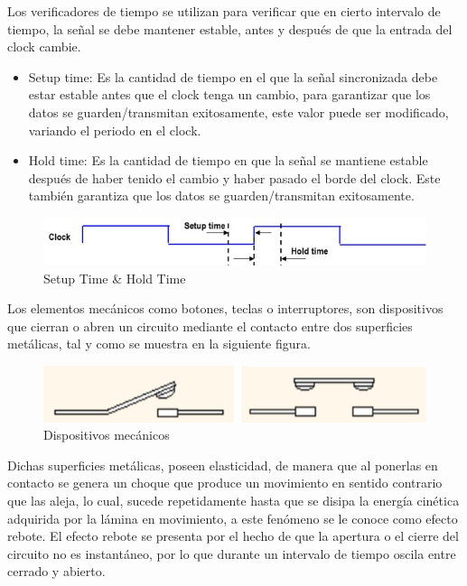 \documentclass[journal,trans]{IEEEtran}
\begin{document}
	Los verificadores de tiempo se utilizan para verificar que en cierto intervalo de tiempo, la señal se debe mantener estable, antes y después de que la entrada del clock cambie.
	
	\vspace{10mm}
	
	\begin{itemize}
		\item Setup time: Es la cantidad de tiempo en el que la señal sincronizada debe estar estable antes que el clock tenga un cambio, para garantizar que los datos se guarden/transmitan exitosamente, este valor puede ser modificado, variando el periodo en el clock.
		\item Hold time: Es la cantidad de tiempo en que la señal se mantiene estable después de haber tenido el cambio y haber pasado el borde del clock. Este también garantiza que los datos se guarden/transmitan exitosamente. 
	\end{itemize}
	
	\begin{figure}[h]
		\centering
		\includegraphics[width=\linewidth]{./imagenes/setup_hold.jpg}
		\caption{Setup Time \& Hold Time \cite{rebote}}
		\label{fig:setup-time}
	\end{figure}
	
	
	Los elementos mecánicos como botones, teclas o interruptores, son dispositivos que cierran o abren un circuito mediante el contacto entre dos superficies metálicas, tal y como se muestra en la siguiente figura.
	
	\begin{figure}[hbtp]
		\centering
		\includegraphics[scale = 0.4]{imagenes/rebote.png}
		\caption[Figura1]{Dispositivos mecánicos \cite{rebote}}
		\label{fig:DispMeca}
	\end{figure}
	
	Dichas superficies metálicas, poseen elasticidad, de manera que al ponerlas en contacto se genera un choque que produce un movimiento en sentido contrario que las aleja, lo cual, sucede repetidamente hasta que se disipa la energía cinética adquirida por la lámina en movimiento, a este fenómeno se le conoce como efecto rebote.
	El efecto rebote se presenta por el hecho de que la apertura o el cierre del circuito no es instantáneo, por lo que durante un intervalo de tiempo oscila entre cerrado y abierto.
	
\end{document}
